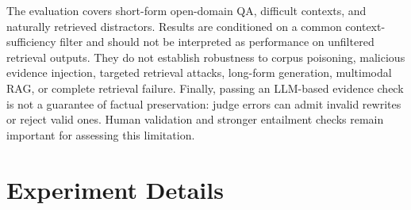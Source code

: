 \documentclass[11pt]{article}
\begin{document}
The evaluation covers short-form open-domain QA, difficult contexts, and naturally retrieved distractors. Results are conditioned on a common context-sufficiency filter and should not be interpreted as performance on unfiltered retrieval outputs. They do not establish robustness to corpus poisoning, malicious evidence injection, targeted retrieval attacks, long-form generation, multimodal RAG, or complete retrieval failure. Finally, passing an LLM-based evidence check is not a guarantee of factual preservation: judge errors can admit invalid rewrites or reject valid ones. Human validation and stronger entailment checks remain important for assessing this limitation.




% 




\appendix

\section{Experiment Details}
\end{document}
